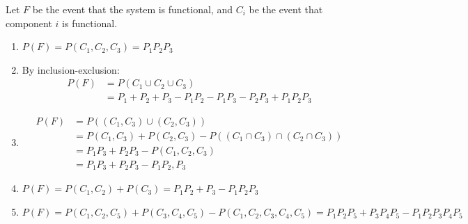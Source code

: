 \begin{problem}{29} Let $F$ be the event that the system is functional, and $C_i$ be the event that component $i$ is functional.
	\begin{enumerate}
		\item $P(F) = P(C_1, C_2, C_3) = P_1 P_2 P_3$
		\item By inclusion-exclusion:
		\begin{align*} 
		P(F) &= P(C_1\cup C_2 \cup C_3) \\
		& = P_1+ P_2 +P_3 -P_1P_2-P_1P_3-P_2P_3+P_1P_2P_3
		\end{align*} 
		

		\item 
			\begin{align*}
				P(F) &= P((C_1, C_3) \cup (C_2, C_3)) \\
				& = P(C_1, C_3)+P(C_2, C_3) - P((C_1\cap C_3) \cap (C_2 \cap C_3)) \\
				& = P_1 P_3+P_2 P_3 - P(C_1, C_2, C_3) \\
				& = P_1 P_3+P_2 P_3 - P_1 P_2, P_3 
			\end{align*}
			
		\item $P(F) = P(C_1, C_2)+P(C_3) = P_1 P_2 +P_3 - P_1 P_2 P_3$
		\item $P(F) = P(C_1, C_2, C_5)+P(C_3, C_4, C_5) - P(C_1, C_2, C_3, C_4, C_5) = P_1 P_2 P_5+P_3 P_4 P_5 - P_1 P_2 P_3 P_4 P_5 $
	\end{enumerate}

\end{problem}
	
